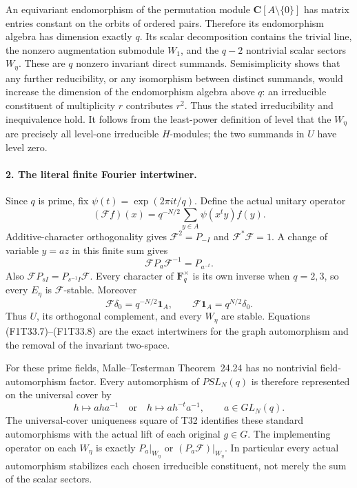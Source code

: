 An equivariant endomorphism of the permutation module
\(\mathbf C[A\setminus\{0\}]\) has matrix entries
constant on the orbits of ordered pairs. Therefore
its endomorphism algebra has dimension exactly \(q\).
Its scalar decomposition contains the trivial line,
the nonzero augmentation submodule \(W_1\), and the
\(q-2\) nontrivial scalar sectors \(W_\eta\).
These are \(q\) nonzero invariant direct summands.
Semisimplicity shows that any further reducibility,
or any isomorphism between distinct summands, would
increase the dimension of the endomorphism algebra
above \(q\): an irreducible constituent of multiplicity
\(r\) contributes \(r^2\). Thus the stated
irreducibility and inequivalence hold.
It follows from the least-power definition of level
that the \(W_\eta\) are precisely all level-one
irreducible \(H\)-modules; the two summands in \(U\)
have level zero.

\paragraph{2. The literal finite Fourier intertwiner.}
Since \(q\) is prime, fix
\(\psi(t)=\exp(2\pi i t/q)\). Define the actual unitary
operator
\[
 (\mathcal F f)(x)=q^{-N/2}
       \sum_{y\in A}\psi(x^t y)f(y).
 \tag{F1T33.6}
\]
Additive-character orthogonality gives
\(\mathcal F^2=P_{-I}\) and
\(\mathcal F^*\mathcal F=1\). A change of variable
\(y=az\) in this finite sum gives
\[
       \mathcal F P_a\mathcal F^{-1}=P_{a^{-t}}.
 \tag{F1T33.7}
\]
Also \(\mathcal F P_{sI}=P_{s^{-1}I}\mathcal F\).
Every character of \(\mathbf F_q^\times\) is its own
inverse when \(q=2,3\), so every \(E_\eta\) is
\(\mathcal F\)-stable. Moreover
\[
 \mathcal F\delta_0=q^{-N/2}\mathbf1_A,
 \qquad
 \mathcal F\mathbf1_A=q^{N/2}\delta_0.
 \tag{F1T33.8}
\]
Thus \(U\), its orthogonal complement, and every
\(W_\eta\) are stable. Equations (F1T33.7)--(F1T33.8)
are the exact intertwiners for the graph automorphism
and the removal of the invariant two-space.

For these prime fields, Malle--Testerman
Theorem~24.24 has no nontrivial field-automorphism
factor. Every automorphism of \(PSL_N(q)\) is therefore
represented on the universal cover by
\[
 h\longmapsto aha^{-1}
 \quad\text{or}\quad
 h\longmapsto ah^{-t}a^{-1},
              \qquad a\in GL_N(q).
 \tag{F1T33.9}
\]
The universal-cover uniqueness square of T32 identifies
these standard automorphisms with the actual lift of
each original \(g\in G\). The implementing operator
on each \(W_\eta\) is exactly
\(P_a|_{W_\eta}\) or
\((P_a\mathcal F)|_{W_\eta}\).
In particular every actual automorphism stabilizes
each chosen irreducible constituent, not merely the
sum of the scalar sectors.

